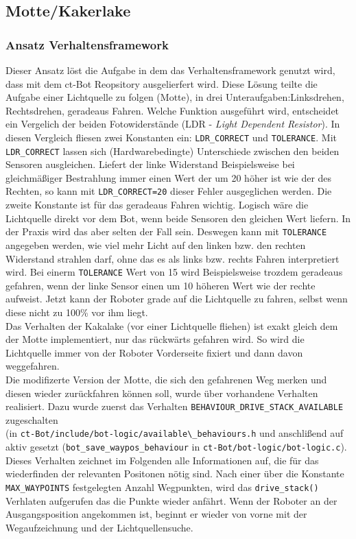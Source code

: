 \subsection{Motte/Kakerlake}
\label{motte_kakerlake}

\subsubsection{Ansatz Verhaltensframework}

Dieser Ansatz löst die Aufgabe in dem das Verhaltensframework
genutzt wird, dass mit dem ct-Bot Reopsitory ausgelierfert wird.
Diese Lösung teilte die Aufgabe einer Lichtquelle zu folgen (Motte), in drei
Unteraufgaben:Linksdrehen, Rechtsdrehen, geradeaus Fahren.
Welche Funktion ausgeführt wird, entscheidet ein Vergelich der beiden Fotowiderstände
(LDR - \textit{Light Dependent Resistor}). In diesen Vergleich fliesen zwei Konstanten ein:
\verb+LDR_CORRECT+ und \verb+TOLERANCE+. Mit \verb+LDR_CORRECT+ lassen sich
(Hardwarebedingte) Unterschiede zwischen den beiden Sensoren ausgleichen. Liefert
der linke Widerstand Beispielsweise bei gleichmäßiger Bestrahlung immer einen
Wert der um 20 höher ist wie der des Rechten, so kann mit \verb+LDR_CORRECT=20+ dieser
Fehler ausgeglichen werden. Die zweite Konstante ist für das geradeaus Fahren wichtig.
Logisch wäre die Lichtquelle direkt vor dem Bot, wenn beide Sensoren den gleichen
Wert liefern. In der Praxis wird das aber selten der Fall sein. Deswegen kann mit
\verb+TOLERANCE+ angegeben werden, wie viel mehr Licht auf den linken bzw. den rechten
Widerstand strahlen darf, ohne das es als links bzw. rechts Fahren interpretiert wird.
Bei einerm \verb+TOLERANCE+ Wert von 15 wird Beispielsweise trozdem geradeaus gefahren,
wenn der linke Sensor einen um 10 höheren Wert wie der rechte aufweist. Jetzt kann
der Roboter grade auf die Lichtquelle zu fahren, selbst wenn diese nicht zu 100\%
vor ihm liegt. \\

Das Verhalten der Kakalake (vor einer Lichtquelle fliehen) ist exakt gleich dem der 
Motte implementiert, nur das rückwärts gefahren wird. So wird die Lichtquelle immer
von der Roboter Vorderseite fixiert und dann davon weggefahren. \\

Die modifizerte Version der Motte, die sich den gefahrenen Weg merken und diesen 
wieder zurückfahren können soll, wurde über vorhandene Verhalten realisiert.
Dazu wurde zuerst das Verhalten \verb+BEHAVIOUR_DRIVE_STACK_AVAILABLE+ zugeschalten \\
(in \verb+ct-Bot/include/bot-logic/available\_behaviours.h+ und anschlißend
auf aktiv gesetzt (\verb+bot_save_waypos_behaviour+ in
\verb+ct-Bot/bot-logic/bot-logic.c+). Dieses Verhalten zeichnet im Folgenden
alle Informationen auf, die für das wiederfinden der relevanten Positonen nötig sind.
Nach einer über die Konstante \verb+MAX_WAYPOINTS+ festgelegten Anzahl Wegpunkten,
wird das \verb+drive_stack()+ Verhlaten aufgerufen das die Punkte wieder anfährt.
Wenn der Roboter an der Ausgangsposition angekommen ist, beginnt er wieder von vorne mit
der Wegaufzeichnung und der Lichtquellensuche. \\

